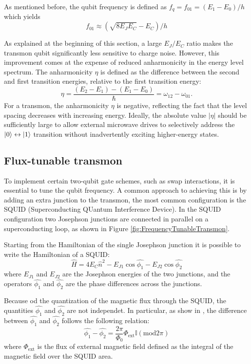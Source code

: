 As mentioned before, the qubit frequency is defined as $f_q = f_{01} = (E_1 - E_0)/h$ which yields
\begin{equation}
    f_01 \approx (\sqrt{8E_JE_C} - E_C)/h
\end{equation}

As explained at the beginning of this section, a large $E_J/E_C$ ratio makes the transmon qubit significantly less sensitive to charge noise. 
However, this improvement comes at the expense of reduced anharmonicity in the energy level spectrum. 
The anharmonicity $\eta$ is defined as the difference between the second and first transition energies, relative to the first transition energy:
\begin{equation}
    \eta = \frac{(E_2 - E_1) - (E_1 - E_0)}{\hbar} = \omega_{12} - \omega_{01}.
\end{equation}
For a transmon, the anharmonicity $\eta$ is negative, reflecting the fact that the level spacing decreases with increasing energy. 
Ideally, the absolute value  $|\eta|$ should be sufficiently large to allow external microwave drives to selectively address the $\ket{0}\leftrightarrow\ket{1}$ transition without inadvertently exciting higher-energy states.


\subsection{Flux-tunable transmon}\label{subsec:flux_tunable_transmon}
To implement certain two-qubit gate schemes, such as swap interactions, it is essential to tune the qubit frequency. 
A common approach to achieving this is by adding an extra junction to the transmon, the most common configuration is the SQUID (Superconducting QUantum Interference Device).
In the SQUID configuration two Josephson junctions are connected in parallel on a superconducting loop, as shown in Figure \ref{fig:FrequencyTunableTransmon}.

Starting from the Hamiltonian of the single Josephson junction it is possible to write the Hamiltonian of a SQUID:
\begin{equation}\label{eq:SQUID_Hamiltonian}
    \hat{H} = 4E_C\hat{n}^2 - E_{J1}\cos{\hat{\phi_1}} - E_{J2}\cos{\hat{\phi_2}}
\end{equation}
where $E_{J1}$ and $E_{J2}$ are the Josephson energies of the two junctions, and the operators $\hat{\phi_1}$ and $\hat{\phi_2}$ are the phase differences across the junctions.

Because od the quantization of the magnetic flux through the SQUID, the quantities $\hat{\phi_1}$ and $\hat{\phi_2}$ are not independet. 
In particular, as show in \cite{manenti_quantum_2023}, the difference between $\hat{\phi_1}$ and $\hat{\phi_2}$ follows the following relation:
\begin{equation}\label{eq:phases_relation}
    \hat{\phi_1} - \hat{\phi_2} = \frac{2\pi}{\Phi_0}\Phi_{\text{ext}}\mathbb{I}(\text{mod}2\pi)
\end{equation}
where $\Phi_{\text{ext}}$ is the flux of external magnetic field defined as the integral of the magnetic field over the SQUID area.

